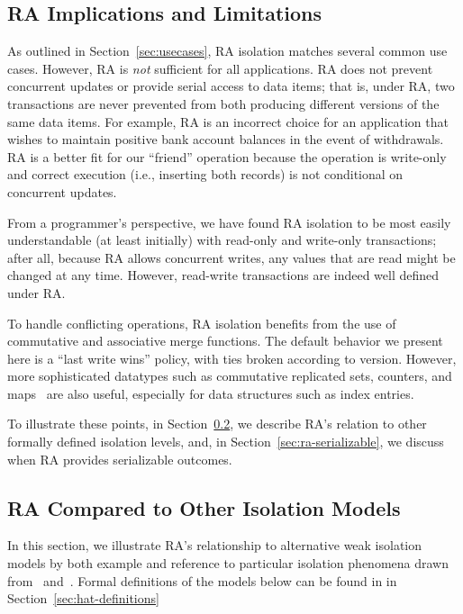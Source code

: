 \subsection{RA Implications and Limitations}
\label{sec:usage}

As outlined in Section~\ref{sec:usecases}, RA isolation matches
several common use cases. However, RA is \textit{not} sufficient for
all applications. RA does not prevent concurrent updates or provide
serial access to data items; that is, under RA, two transactions are
never prevented from both producing different versions of the same
data items. For example, RA is an incorrect choice for an application
that wishes to maintain positive bank account balances in the event of
withdrawals. RA is a better fit for our ``friend'' operation because
the operation is write-only and correct execution (i.e., inserting
both records) is not conditional on concurrent updates.

From a programmer's perspective, we have found RA isolation to be most
easily understandable (at least initially) with read-only and
write-only transactions; after all, because RA allows concurrent
writes, any values that are read might be changed at any
time. However, read-write transactions are indeed well defined under
RA.

To handle conflicting operations, RA isolation benefits from the use
of commutative and associative merge functions. The default behavior
we present here is a ``last write wins'' policy, with ties broken
according to version. However, more sophisticated datatypes such as
commutative replicated sets, counters, and maps~\cite{crdt} are also
useful, especially for data structures such as index entries.

To illustrate these points, in Section~\ref{sec:ra-compare}, we
describe RA's relation to other formally defined isolation levels,
and, in Section~\ref{sec:ra-serializable}, we discuss when RA provides
serializable outcomes.

\subsection{RA Compared to Other Isolation Models}
\label{sec:ra-compare}

In this section, we illustrate RA's relationship to alternative weak
isolation models by both example and reference to particular isolation
phenomena drawn from~\cite{adya} and~\cite{hat-vldb}. Formal
definitions of the models below can be found in in
Section~\ref{sec:hat-definitions}

